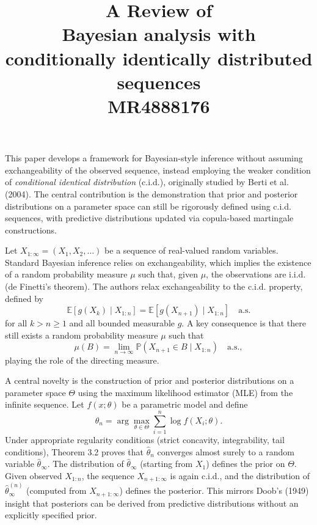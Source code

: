 \documentclass[11pt]{article}
\title{A Review of \\Bayesian analysis with conditionally
	identically distributed sequences \\    MR4888176 }
\begin{document}
	\maketitle	





This paper develops a framework for Bayesian-style inference without assuming exchangeability of the observed sequence, instead employing the weaker condition of \emph{conditional identical distribution} (c.i.d.), originally studied by Berti et al. (2004). The central contribution is the demonstration that prior and posterior distributions on a parameter space can still be rigorously defined using c.i.d. sequences, with predictive distributions updated via copula-based martingale constructions.

Let $X_{1:\infty} = (X_1, X_2, \dots)$ be a sequence of real-valued random variables. Standard Bayesian inference relies on exchangeability, which implies the existence of a random probability measure $\mu$ such that, given $\mu$, the observations are i.i.d. (de Finetti's theorem). The authors relax exchangeability to the c.i.d. property, defined by 
\[
\mathbb{E}[g(X_k) \mid X_{1:n}] = \mathbb{E}[g(X_{n+1}) \mid X_{1:n}] \quad \text{a.s.}
\]
for all $k > n \geq 1$ and all bounded measurable $g$. A key consequence is that there still exists a random probability measure $\mu$ such that 
\[
\mu(B) = \lim_{n\to\infty} \mathbb{P}(X_{n+1} \in B \mid X_{1:n}) \quad \text{a.s.},
\]
playing the role of the directing measure.

A central novelty is the construction of prior and posterior distributions on a parameter space $\Theta$ using the maximum likelihood estimator (MLE) from the infinite sequence. Let $f(x;\theta)$ be a parametric model and define 
\[
\hat{\theta}_n = \arg\max_{\theta \in \Theta} \sum_{i=1}^n \log f(X_i;\theta).
\]
Under appropriate regularity conditions (strict concavity, integrability, tail conditions), Theorem 3.2 proves that $\hat{\theta}_n$ converges almost surely to a random variable $\hat{\theta}_\infty$. The distribution of $\hat{\theta}_\infty$ (starting from $X_1$) defines the prior on $\Theta$. Given observed $X_{1:n}$, the sequence $X_{n+1:\infty}$ is again c.i.d., and the distribution of $\hat{\theta}_\infty^{(n)}$ (computed from $X_{n+1:\infty}$) defines the posterior. This mirrors Doob's (1949) insight that posteriors can be derived from predictive distributions without an explicitly specified prior.
\end{document}
